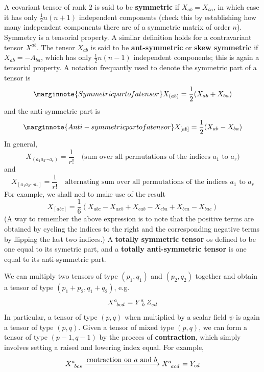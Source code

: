 A covariant tensor of rank $2$ is said to be \textbf{symmetric} if $X_{ab}=X_{ba}$, in which case it has only $\frac{1}{2}n(n+1)$ independent components (check this by establishing how many independent components there are of a symmetric matrix of order $n$). Symmetry is a tensorial property. A similar definition holds for a contravariant tensor $X^{ab}$. The tensor $X_{ab}$ is said to be \textbf{ant-symmetric} or \textbf{skew symmetric} if $X_{ab}=-A_{ba}$, which has only $\frac{1}{2}n(n-1)$ independent components; this is again a tensorial property. A notation frequantly used to denote the symmetric part of a tensor is
\begin{equation}\label{5.27}\marginnote{Symmetric part of a tensor}
  X_{(ab)}=\frac{1}{2}(X_{ab}+X_{ba})
\end{equation}
and the anti-symmetric part is
\begin{equation}\label{5.28}\marginnote{Anti-symmetric part of a tensor}
  X_{[ab]}=\frac{1}{2}(X_{ab}-X_{ba})
\end{equation}
In general, 
\begin{equation}
  X_{(a_1a_2\cdots a_r)}=\frac{1}{r!}\quad\mbox{(sum over all permutations of the indices $a_1$ to $a_r$)}
\end{equation}
and
\begin{equation}
  X_{[a_1a_2\cdots a_r]}=\frac{1}{r!}\quad\mbox{alternating sum over all permutations of the indices $a_1$ to $a_r$}
\end{equation}
For example, we shall ned to make use of the result
\begin{equation}\label{5.29}
  X_{[abc]}=\frac{1}{6}(X_{abc}-X_{axb}+X_{cab}-X_{cba}+X_{bca}-X_{bac})
\end{equation}
(A way to remember the above expression is to note that the positive terms are obtained by cycling the indices to the right and the corresponding negative terms by flipping the last two indices.) A \textbf{totally symmetric tensor} os defined to be one equal to its symetric part, and a \textbf{totally anti-symmetric tensor} is one equal to its anti-symmetric part.

We can multiply two tensors of type $(p_1,q_1)$ and $(p_2,q_2)$ together and obtain a tensor of type $(p_1+p_2, q_1+q_2)$, e.g.
\begin{equation}\label{5.30}
  \tensor{X}{^{a}_{bcd}}=\tensor{Y}{^{a}_b}\tensor{Z}{_{cd}}
\end{equation}
In particular, a tensor of type $(p,q)$ when multiplied by a scalar field $\psi$ is again a tensor of type $(p,q)$. Given a tensor of mixed type $(p,q)$, we can form a tensor of type $(p-1,q-1)$ by the procces of \textbf{contraction}, which simply involves setting a raised and lowering index equal. For example,
\begin{equation*}
  \tensor{X}{^{a}_{bcs}}\xrightarrow{\mbox{contraction on $a$ and $b$}}\tensor{X}{^{a}_{acd}}=Y_{cd}
\end{equation*}


